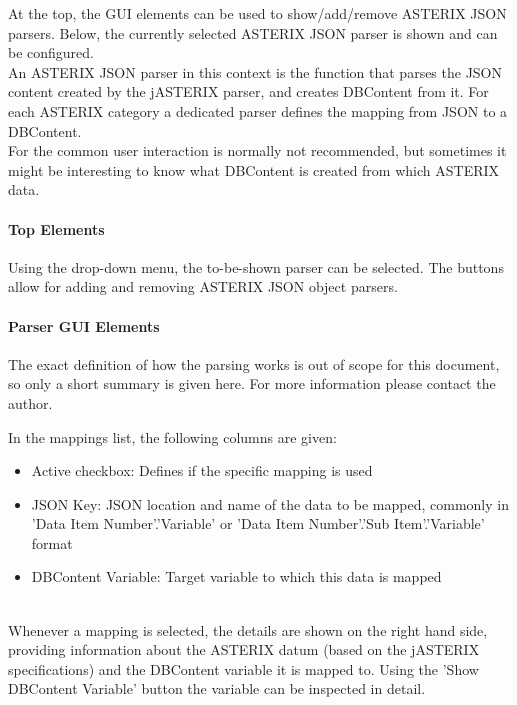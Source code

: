At the top, the GUI elements can be used to show/add/remove ASTERIX JSON parsers. Below, the currently selected ASTERIX JSON parser is shown and can be configured. \\

An ASTERIX JSON parser in this context is the function that parses the JSON content created by the jASTERIX parser, and creates DBContent from it. 
For each ASTERIX category a dedicated parser defines the mapping from JSON to a DBContent. \\

For the common user interaction is normally not recommended, but sometimes it might be interesting to know what DBContent is created from which ASTERIX data.

\paragraph{Top Elements}

Using the drop-down menu, the to-be-shown parser can be selected. The buttons allow for adding and removing ASTERIX JSON object parsers.

\paragraph{Parser GUI Elements}

The exact definition of how the parsing works is out of scope for this document, so only a short summary is given here. For more information please contact the author.

In the mappings list, the following columns are given:

\begin{itemize}
\item Active checkbox: Defines if the specific mapping is used
\item JSON Key: JSON location and name of the data to be mapped, commonly in 'Data Item Number'.'Variable' or 'Data Item Number'.'Sub Item'.'Variable' format
\item DBContent Variable: Target variable to which this data is mapped
\end{itemize}
\ \\

Whenever a mapping is selected, the details are shown on the right hand side, providing information about the ASTERIX datum (based on the jASTERIX specifications) and the DBContent variable it is mapped to. 
Using the 'Show DBContent Variable' button the variable can be inspected in detail.

